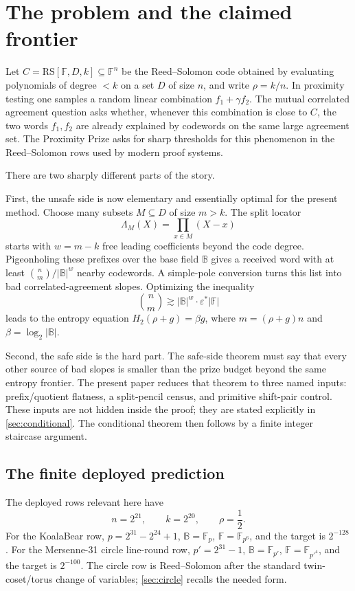 \documentclass[11pt]{article}
\theoremstyle{definition}
\theoremstyle{remark}
\newcommand{\F}{\mathbb F}
\newcommand{\BB}{\mathbb B}
\newcommand{\RS}{\mathrm{RS}}
\newcommand{\Hb}{H_2}
\newcommand{\epsstar}{\varepsilon^*}
\begin{document}
\section{The problem and the claimed frontier}\label{sec:intro}

Let \(C=\RS[\F,D,k]\subseteq\F^n\) be the Reed--Solomon code obtained by evaluating polynomials of degree \(<k\) on a set \(D\) of size \(n\), and write \(\rho=k/n\).  In proximity testing one samples a random linear combination \(f_1+\gamma f_2\).  The mutual correlated agreement question asks whether, whenever this combination is close to \(C\), the two words \(f_1,f_2\) are already explained by codewords on the same large agreement set.  The Proximity Prize asks for sharp thresholds for this phenomenon in the Reed--Solomon rows used by modern proof systems.

There are two sharply different parts of the story.

First, the unsafe side is now elementary and essentially optimal for the present method.  Choose many subsets \(M\subseteq D\) of size \(m>k\).  The split locator
\[
        \Lambda_M(X)=\prod_{x\in M}(X-x)
\]
starts with \(w=m-k\) free leading coefficients beyond the code degree.  Pigeonholing these prefixes over the base field \(\BB\) gives a received word with at least \(\binom nm/|\BB|^w\) nearby codewords.  A simple-pole conversion turns this list into bad correlated-agreement slopes.  Optimizing the inequality
\[
        \binom nm\gtrsim |\BB|^w\cdot \epsstar |
        \F|
\]
leads to the entropy equation \(\Hb(\rho+g)=\beta g\), where \(m=(\rho+g)n\) and \(\beta=\log_2|\BB|\).

Second, the safe side is the hard part.  The safe-side theorem must say that every other source of bad slopes is smaller than the prize budget beyond the same entropy frontier.  The present paper reduces that theorem to three named inputs: prefix/quotient flatness, a split-pencil census, and primitive shift-pair control.  These inputs are not hidden inside the proof; they are stated explicitly in \cref{sec:conditional}.  The conditional theorem then follows by a finite integer staircase argument.

\subsection{The finite deployed prediction}

The deployed rows relevant here have
\[
        n=2^{21},\qquad k=2^{20},\qquad \rho=\frac12 .
\]
For the KoalaBear row, \(p=2^{31}-2^{24}+1\), \(\BB=\F_p\), \(\F=\F_{p^6}\), and the target is \(2^{-128}\).  For the Mersenne-31 circle line-round row, \(p'=2^{31}-1\), \(\BB=\F_{p'}\), \(\F=\F_{p'^4}\), and the target is \(2^{-100}\).  The circle row is Reed--Solomon after the standard twin-coset/torus change of variables; \cref{sec:circle} recalls the needed form.
\end{document}
